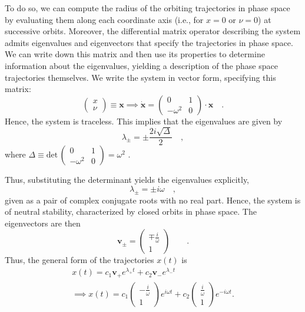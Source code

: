 \documentclass[draft]{agujournal2019}
\begin{document}
To do so, we can compute the radius of the orbiting trajectories in phase space by evaluating them along each coordinate axis (i.e., for $x=0$ or $\nu = 0$) at successive orbits. Moreover, the differential matrix operator describing the system admits eigenvalues and eigenvectors that specify the trajectories in phase space. We can write down this matrix and then use its properties to determine information about the eigenvalues, yielding a description of the phase space trajectories themselves. We write the system in vector form, specifying this matrix:
\begin{equation}
    \begin{pmatrix}
        x \\
        \nu
    \end{pmatrix}    \equiv \mathbf{x} \implies \mathbf{\dot{x}} =  \begin{pmatrix}
        0 & 1 \\
        -\omega^2 & 0
    \end{pmatrix} \cdot \mathbf{x} \quad .
\end{equation}
Hence, the system is traceless. This implies that the eigenvalues are given by 
\begin{equation*}
    \lambda_\pm = \pm \frac{2i\sqrt{\Delta}}{2} \quad ,
\end{equation*}
where $\Delta \equiv \mathrm{det}\,\begin{pmatrix}
        0 & 1 \\
        -\omega^2 & 0
    \end{pmatrix} = \omega^2$ .
\par
Thus, substituting the determinant yields the eigenvalues explicitly,
\begin{equation*}
    \lambda_\pm = \pm i\omega \quad ,
\end{equation*}
given as a pair of complex conjugate roots with no real part. Hence, the system is of neutral stability, characterized by closed orbits in phase space. The eigenvectors are then 
\begin{equation*}
\mathbf{v}_\pm =   \begin{pmatrix}
        \mp \frac{i}{\omega} \\
        1
    \end{pmatrix} \qquad .
\end{equation*}
Thus, the general form of the trajectories $x(t)$ is 
\begin{align*}
    x(t) = c_1 \mathbf{v}_+ e^{\lambda_+ t} + c_2 \mathbf{v}_- e^{\lambda_- t} \\
    \implies     x(t) = c_1 \begin{pmatrix}
        - \frac{i}{\omega} \\
        1
    \end{pmatrix} e^{i\omega t} + c_2 \begin{pmatrix}
        \frac{i}{\omega} \\
        1
    \end{pmatrix} e^{-i\omega t} .\\
\end{align*}
\end{document}
